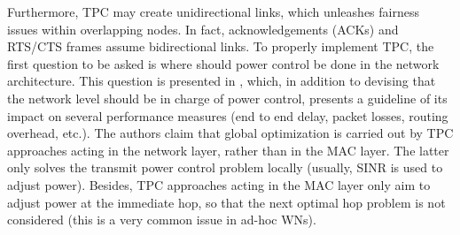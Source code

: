 \documentclass[12pt, a4paper,twoside]{tesi_upf}
\begin{document}
				Furthermore, TPC may create unidirectional links, which unleashes fairness issues within overlapping nodes. In fact, acknowledgements (ACKs) and RTS/CTS frames assume bidirectional links. To properly implement TPC, the first question to be asked is where should power control be done in the network architecture. This question is presented in \cite{kawadia2005principles}, which, in addition to devising that the network level should be in charge of power control, presents a guideline of its impact on several performance measures (end to end delay, packet losses, routing overhead, etc.). The authors claim that global optimization is carried out by TPC approaches acting in the network layer, rather than in the MAC layer. The latter only solves the transmit power control problem locally (usually, SINR is used to adjust power). Besides, TPC approaches acting in the MAC layer only aim to adjust power at the immediate hop, so that the next optimal hop problem is not considered (this is a very common issue in ad-hoc WNs).
				
\end{document}
